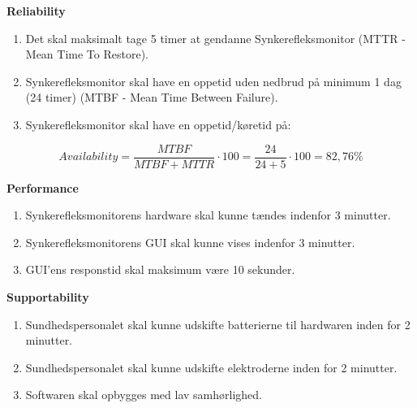 \documentclass[main.tex]{subfiles}
\begin{document}
\textbf{Reliability}
\begin{enumerate}
\item Det skal maksimalt tage 5 timer at gendanne Synkerefleksmonitor (MTTR - Mean Time To Restore).
\item Synkerefleksmonitor skal have en oppetid uden nedbrud på minimum 1 dag (24 timer) (MTBF - Mean Time Between Failure).  
\item Synkerefleksmonitor skal have en oppetid/køretid på: 
\end{enumerate}


\begin{equation}
Availability = \frac{MTBF}{MTBF+MTTR}\cdot100 = \frac{24}{24+5}\cdot100 = 82,76 \%
\end{equation}

					
\textbf{Performance}
\begin{enumerate}
\item Synkerefleksmonitorens hardware skal kunne tændes indenfor 3 minutter.
\item Synkerefleksmonitorens GUI skal kunne vises indenfor 3 minutter.
\item GUI'ens responstid skal maksimum være 10 sekunder.

\end{enumerate}


\textbf{Supportability}
\begin{enumerate}
\item Sundhedspersonalet skal kunne udskifte batterierne til hardwaren inden for 2 minutter.
\item Sundhedspersonalet skal kunne udskifte elektroderne inden for 2 minutter.
\item Softwaren skal opbygges med lav samhørlighed.
\end{enumerate}

\newpage

\newpage
\listoffigures
\newpage
\listoftables
\end{document}
